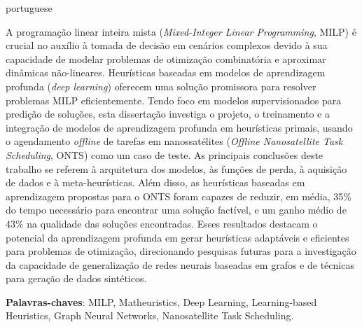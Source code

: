 \begin{resumo}[Resumo]
\begin{otherlanguage*}{portuguese}

\noindent

A programação linear inteira mista (\emph{Mixed-Integer Linear Programming}, MILP) é crucial no auxílio à tomada de decisão em cenários complexos devido à sua capacidade de modelar problemas de otimização combinatória e aproximar dinâmicas não-lineares.
Heurísticas baseadas em modelos de aprendizagem profunda (\emph{deep learning}) oferecem uma solução promissora para resolver problemas MILP eficientemente.
Tendo foco em modelos supervisionados para predição de soluções, esta dissertação investiga o projeto, o treinamento e a integração de modelos de aprendizagem profunda em heurísticas primais, usando o agendamento \emph{offline} de tarefas em nanossatélites (\emph{Offline Nanosatellite Task Scheduling}, ONTS) como um caso de teste.
As principais conclusões deste trabalho se referem à arquitetura dos modelos, às funções de perda, à aquisição de dados e à meta-heurísticas.
Além disso, as heurísticas baseadas em aprendizagem propostas para o ONTS foram capazes de reduzir, em média, 35\% do tempo necessário para encontrar uma solução factível, e um ganho médio de 43\% na qualidade das soluções encontradas.
Esses resultados destacam o potencial da aprendizagem profunda em gerar heurísticas adaptáveis e eficientes para problemas de otimização, direcionando pesquisas futuras para a investigação da capacidade de generalização de redes neurais baseadas em grafos e de técnicas para geração de dados sintéticos.

\vspace{\onelineskip}

\noindent
\textbf{Palavras-chaves}: MILP, Matheuristics, Deep Learning, Learning-based Heuristics, Graph Neural Networks, Nanosatellite Task Scheduling.

\end{otherlanguage*}
\end{resumo}


